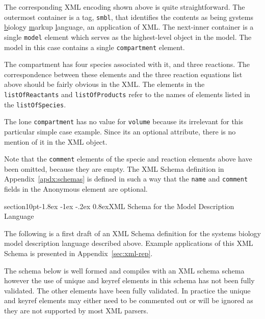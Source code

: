 \documentclass[10pt]{article}
\makeatletter
\renewcommand{\section}{\@startsection%
  {section}{1}{0pt}{-1.8ex \@plus -1ex \@minus -.2ex}%
  {0.8ex}{\normalfont\Large\bfseries}}
\newcommand{\class}[1]{\textsf{#1}}
\makeatother
\begin{document}
The corresponding XML encoding shown above is quite
straightforward. The outermost container is a tag, \texttt{smbl},
that identifies the contents as being \underline{s}ystems
\underline{b}iology \underline{m}arkup \underline{l}anguage, an
application of XML. The next-inner container is a single
\texttt{model} element which serves as the highest-level object in
the model.  The model in this case contains a single
\texttt{compartment} element.

The compartment has four species associated with it, and three
reactions. The correspondence between these elements and the
three reaction equations list above should be fairly obvious in
the XML.  The elements in the
\texttt{listOfReactants} and \texttt{listOfProducts} refer to the
names of elements listed in the \texttt{listOfSpecies}.

The lone \texttt{compartment} has no value for \texttt{volume}
because its irrelevant for this particular simple case example.
Since its an optional attribute, there is no mention of it in the
XML object.

Note that the \texttt{comment} elements of the specie and
reaction elements above have been omitted, because they are
empty.  The XML Schema definition in Appendix~\ref{apdx:schemas}
is defined in such a way that the \texttt{name} and
\texttt{comment} fields in the \class{Anonymous} element are
optional.


\section{XML Schema for the Model Description Language}
\label{apdx:schemas}

The following is a first draft of an XML Schema definition for
the systems biology model description language described above.
Example applications of this XML Schema is presented in
Appendix~\ref{sec:xml-rep}.

The schema below is well formed and compiles with an XML schema schema
however the use of unique and keyref elements in this schema has not been fully
validated.  The other elements have been fully validated.
In practice the unique and keyref elements may either need to be commented out or
will be ignored as they are not supported by most XML parsers.
\end{document}
